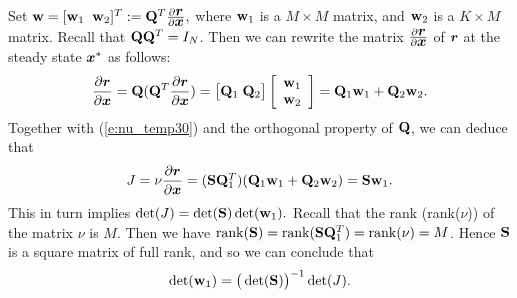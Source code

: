 \documentclass[ amsmath,amssymb,nofootinbib
]{revtex4-1}
\def\mbf#1{\mbox{\boldmath $#1$}}
\newcommand{\be}{\begin{equation}}
\newcommand{\ee}{\end{equation}}
\newcommand{\bQ}{{\bf Q}}
\newcommand{\bS}{{\bf S}}
\newcommand{\bw}{{\bf w}}
\newcommand{\bx}{{\mbf x}}
\newcommand{\br}{{\mbf r}}
\newcommand{\p}{\partial}
\begin{document}
Set
$
 \bw = [\bw_1 \;\;  \bw_2]^T
                    :=  \bQ^T \frac{\p \br}{\p  \bx},
$
where
$\bw_1$ is a $M \times M$ matrix, and $\bw_2$ is a $K \times M$ matrix.
Recall that $\bQ \bQ^T =I_N$.
Then we can rewrite the matrix $\frac{\p \br}{\p \bx}$ of $\br$ at the steady state $\bx^*$ as follows:
\be
 \frac{\p \br}{\p \bx} = \bQ (\bQ^T \frac{\p \br}{\p  \bx})  \\
     =  \big[\bQ_1  \;  \bQ_2\big]
      \left[\begin{array}{c}
                      \bw_1 \\
                      \bw_2\\
                    \end{array}\right] = \bQ_1\bw_1 + \bQ_2\bw_2.
\ee
Together with (\ref{e:nu_temp30}) and the orthogonal property of $\bQ$,
we can deduce that
\be
\begin{array}{ll}
 J =   \nu \dfrac{\p \br}{\p \bx}
         = (\bS \bQ_1^T) (\bQ_1\bw_1 + \bQ_2\bw_2)
         = \bS \bw_1.
\end{array}
\ee
This in turn implies
$
    \det(J) =  \det(\bS) \det(\bw_1).
$
Recall that the rank (rank($\nu$)) of the matrix $\nu$ is  $M$.
Then we have ${\rm rank}(\bS) = {\rm rank}(\bS \bQ_1^T) = {\rm rank}(\nu) = M$.
Hence $\bS$ is a square matrix of full rank,
and so we can conclude that
\be \label{c:df_coker0}
           \det(\bw_1) =  \big(\det(\bS)\big)^{-1} \det(J).
\ee
\end{document}
